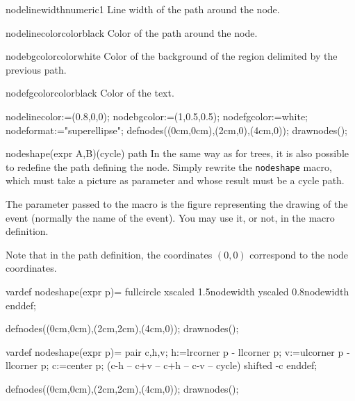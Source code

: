 \documentclass[11pt,a4paper,english]{article}
\begin{document}
\begin{mptparam}{nodelinewidth}{numeric}{1}
Line width of the path around the node.
\end{mptparam}

\begin{mptparam}{nodelinecolor}{color}{black}
Color of the path around the node.
\end{mptparam}

\begin{mptparam}{nodebgcolor}{color}{white}
Color of the background of the region delimited by the previous path.
\end{mptparam}

\begin{mptparam}{nodefgcolor}{color}{black}
Color of the text.
\end{mptparam}


\begin{exemple}[lefthand ratio = 0.6]
nodelinecolor:=(0.8,0,0);
nodebgcolor:=(1,0.5,0.5);
nodefgcolor:=white;
nodeformat:="superellipse";
defnodes((0cm,0cm),(2cm,0),(4cm,0));
drawnodes();
\end{exemple}


\begin{rpobjet}{nodeshape(expr A,B)}{(cycle) path}
In the same way as for trees, it is also possible to redefine the path defining the node. Simply rewrite the \verb|nodeshape| macro, which must take a picture as parameter and whose result must be a cycle path.

The parameter passed to the macro is the figure representing the drawing of the event (normally the name of the event). You may use it, or not, in the macro definition.

Note that in the path definition, the coordinates $(0,0)$ correspond to the node coordinates.

\end{rpobjet}

\begin{exemple}[lefthand ratio = 0.65]
vardef nodeshape(expr p)=
  fullcircle xscaled 1.5nodewidth yscaled 0.8nodewidth
enddef;

defnodes((0cm,0cm),(2cm,2cm),(4cm,0));
drawnodes();
\end{exemple}


\begin{exemple}[lefthand ratio = 0.65]
vardef nodeshape(expr p)=
  pair c,h,v;
  h:=lrcorner p - llcorner p;
  v:=ulcorner p - llcorner p;
  c:=center p;
  (c-h -- c+v -- c+h -- c-v -- cycle) shifted -c
enddef;

defnodes((0cm,0cm),(2cm,2cm),(4cm,0));
drawnodes();
\end{exemple}
\end{document}
